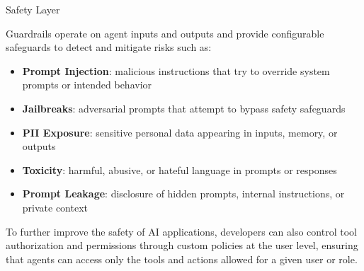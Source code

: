 \begin{frame}{Safety Layer}

\small
Guardrails operate on agent inputs and outputs and provide configurable safeguards to detect and mitigate risks such as:

\begin{itemize}\setlength\itemsep{0.2em}
  \item \textbf{Prompt Injection}: malicious instructions that try to override system prompts or intended behavior
  \item \textbf{Jailbreaks}: adversarial prompts that attempt to bypass safety safeguards
  \item \textbf{PII Exposure}: sensitive personal data appearing in inputs, memory, or outputs
  \item \textbf{Toxicity}: harmful, abusive, or hateful language in prompts or responses
  \item \textbf{Prompt Leakage}: disclosure of hidden prompts, internal instructions, or private context
\end{itemize}

\vspace{0.4em}

To further improve the safety of AI applications, developers can also control tool authorization and permissions through custom policies at the user level, ensuring that agents can access only the tools and actions allowed for a given user or role.

\end{frame}
